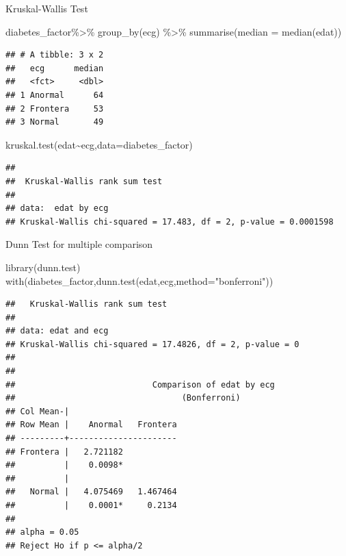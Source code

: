 \documentclass[
  ignorenonframetext,
]{beamer}
\newenvironment{Shaded}{\begin{snugshade}}{\end{snugshade}}
\newcommand{\AttributeTok}[1]{\textcolor[rgb]{0.77,0.63,0.00}{#1}}
\newcommand{\FunctionTok}[1]{\textcolor[rgb]{0.00,0.00,0.00}{#1}}
\newcommand{\NormalTok}[1]{#1}
\newcommand{\SpecialCharTok}[1]{\textcolor[rgb]{0.00,0.00,0.00}{#1}}
\newcommand{\StringTok}[1]{\textcolor[rgb]{0.31,0.60,0.02}{#1}}
\begin{document}
\begin{frame}[fragile]{Kruskal-Wallis Test}
\protect\hypertarget{kruskal-wallis-test}{}
\small

\begin{Shaded}
\begin{Highlighting}[]
\NormalTok{diabetes\_factor}\SpecialCharTok{\%\textgreater{}\%} 
  \FunctionTok{group\_by}\NormalTok{(ecg) }\SpecialCharTok{\%\textgreater{}\%} 
  \FunctionTok{summarise}\NormalTok{(}\AttributeTok{median =} \FunctionTok{median}\NormalTok{(edat)) }
\end{Highlighting}
\end{Shaded}

\begin{verbatim}
## # A tibble: 3 x 2
##   ecg      median
##   <fct>     <dbl>
## 1 Anormal      64
## 2 Frontera     53
## 3 Normal       49
\end{verbatim}

\begin{Shaded}
\begin{Highlighting}[]
\FunctionTok{kruskal.test}\NormalTok{(edat}\SpecialCharTok{\textasciitilde{}}\NormalTok{ecg,}\AttributeTok{data=}\NormalTok{diabetes\_factor)}
\end{Highlighting}
\end{Shaded}

\begin{verbatim}
## 
##  Kruskal-Wallis rank sum test
## 
## data:  edat by ecg
## Kruskal-Wallis chi-squared = 17.483, df = 2, p-value = 0.0001598
\end{verbatim}
\end{frame}

\begin{frame}[fragile]{Dunn Test for multiple comparison}
\protect\hypertarget{dunn-test-for-multiple-comparison}{}
\small

\begin{Shaded}
\begin{Highlighting}[]
\FunctionTok{library}\NormalTok{(dunn.test)}
\FunctionTok{with}\NormalTok{(diabetes\_factor,}\FunctionTok{dunn.test}\NormalTok{(edat,ecg,}\AttributeTok{method=}\StringTok{"bonferroni"}\NormalTok{))}
\end{Highlighting}
\end{Shaded}

\begin{verbatim}
##   Kruskal-Wallis rank sum test
## 
## data: edat and ecg
## Kruskal-Wallis chi-squared = 17.4826, df = 2, p-value = 0
## 
## 
##                            Comparison of edat by ecg                           
##                                  (Bonferroni)                                  
## Col Mean-|
## Row Mean |    Anormal   Frontera
## ---------+----------------------
## Frontera |   2.721182
##          |    0.0098*
##          |
##   Normal |   4.075469   1.467464
##          |    0.0001*     0.2134
## 
## alpha = 0.05
## Reject Ho if p <= alpha/2
\end{verbatim}
\end{frame}
\end{document}
